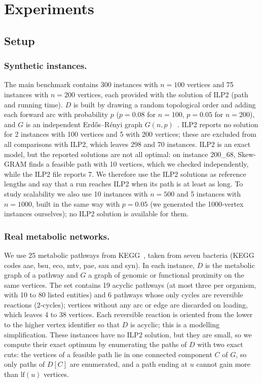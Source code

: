 \documentclass{llncs}
\begin{document}
\section{Experiments}

\subsection{Setup}

\subsubsection{Synthetic instances.}
The main benchmark contains 300 instances with $n=100$ vertices and 75 instances with $n=200$ vertices, each provided with the solution of ILP2 (path and running time). $D$ is built by drawing a random topological order and adding each forward arc with probability $p$ ($p=0.08$ for $n=100$, $p=0.05$ for $n=200$), and $G$ is an independent Erd\H{o}s--Rényi graph $G(n,p)$~\cite{erdos1959}. ILP2 reports no solution for 2 instances with 100 vertices and 5 with 200 vertices; these are excluded from all comparisons with ILP2, which leaves 298 and 70 instances. ILP2 is an exact model, but the reported solutions are not all optimal: on instance 200\_68, Skew-GRAM finds a feasible path with 10 vertices, which we checked independently, while the ILP2 file reports 7. We therefore use the ILP2 solutions as reference lengths and say that a run reaches ILP2 when its path is at least as long. To study scalability we also use 10 instances with $n=500$ and 5 instances with $n=1000$, built in the same way with $p=0.05$ (we generated the 1000-vertex instances ourselves); no ILP2 solution is available for them.

\subsubsection{Real metabolic networks.}
We use 25 metabolic pathways from KEGG~\cite{kanehisa2000}, taken from seven bacteria (KEGG codes aae, bsu, eco, mtv, pae, sau and syn). In each instance, $D$ is the metabolic graph of a pathway and $G$ a graph of genomic or functional proximity on the same vertices. The set contains 19 acyclic pathways (at most three per organism, with 10 to 80 listed entities) and 6 pathways whose only cycles are reversible reactions (2-cycles); vertices without any arc or edge are discarded on loading, which leaves 4 to 38 vertices. Each reversible reaction is oriented from the lower to the higher vertex identifier so that $D$ is acyclic; this is a modelling simplification. These instances have no ILP2 solution, but they are small, so we compute their exact optimum by enumerating the paths of $D$ with two exact cuts: the vertices of a feasible path lie in one connected component $C$ of $G$, so only paths of $D[C]$ are enumerated, and a path ending at $u$ cannot gain more than $\mathrm{lf}(u)$ vertices.
\end{document}
